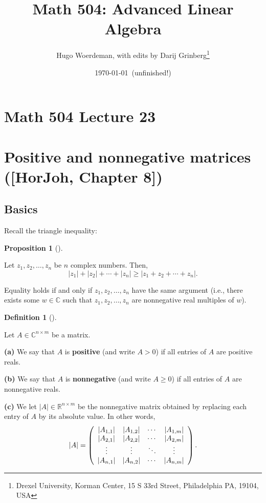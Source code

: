 \documentclass[numbers=enddot,12pt,final,onecolumn,notitlepage]{scrartcl}%
\numberwithin{exer}{subsection}
\theoremstyle{definition}
\newtheorem{prop}[theo]{Proposition}
\newenvironment{proposition}[1][]
{\begin{prop}[#1]\begin{leftbar}}
{\end{leftbar}\end{prop}}
\newtheorem{defi}[theo]{Definition}
\newenvironment{definition}[1][]
{\begin{defi}[#1]\begin{leftbar}}
{\end{leftbar}\end{defi}}
\begin{document}
\title{Math 504: Advanced Linear Algebra}
\author{Hugo Woerdeman, with edits by Darij Grinberg\thanks{Drexel University, Korman
Center, 15 S 33rd Street, Philadelphia PA, 19104, USA}}
\date{\today\ (unfinished!)}
\maketitle
\tableofcontents

\section*{Math 504 Lecture 23}

\section{Positive and nonnegative matrices ([HorJoh, Chapter 8])}

\subsection{Basics}

Recall the triangle inequality:

\begin{proposition}
[triangle inequality]Let $z_{1},z_{2},\ldots,z_{n}$ be $n$ complex numbers.
Then,%
\[
\left\vert z_{1}\right\vert +\left\vert z_{2}\right\vert +\cdots+\left\vert
z_{n}\right\vert \geq\left\vert z_{1}+z_{2}+\cdots+z_{n}\right\vert .
\]


Equality holds if and only if $z_{1},z_{2},\ldots,z_{n}$ have the same
argument (i.e., there exists some $w\in\mathbb{C}$ such that $z_{1}%
,z_{2},\ldots,z_{n}$ are nonnegative real multiples of $w$).
\end{proposition}

\begin{definition}
Let $A\in\mathbb{C}^{n\times m}$ be a matrix.

\textbf{(a)} We say that $A$ is \textbf{positive} (and write $A>0$) if all
entries of $A$ are positive reals.

\textbf{(b)} We say that $A$ is \textbf{nonnegative} (and write $A\geq0$) if
all entries of $A$ are nonnegative reals.

\textbf{(c)} We let $\left\vert A\right\vert \in\mathbb{R}^{n\times m}$ be the
nonnegative matrix obtained by replacing each entry of $A$ by its absolute
value. In other words,%
\[
\left\vert A\right\vert =\left(
\begin{array}
[c]{cccc}%
\left\vert A_{1,1}\right\vert  & \left\vert A_{1,2}\right\vert  & \cdots &
\left\vert A_{1,m}\right\vert \\
\left\vert A_{2,1}\right\vert  & \left\vert A_{2,2}\right\vert  & \cdots &
\left\vert A_{2,m}\right\vert \\
\vdots & \vdots & \ddots & \vdots\\
\left\vert A_{n,1}\right\vert  & \left\vert A_{n,2}\right\vert  & \cdots &
\left\vert A_{n,m}\right\vert
\end{array}
\right)  .
\]

\end{definition}
\end{document}
